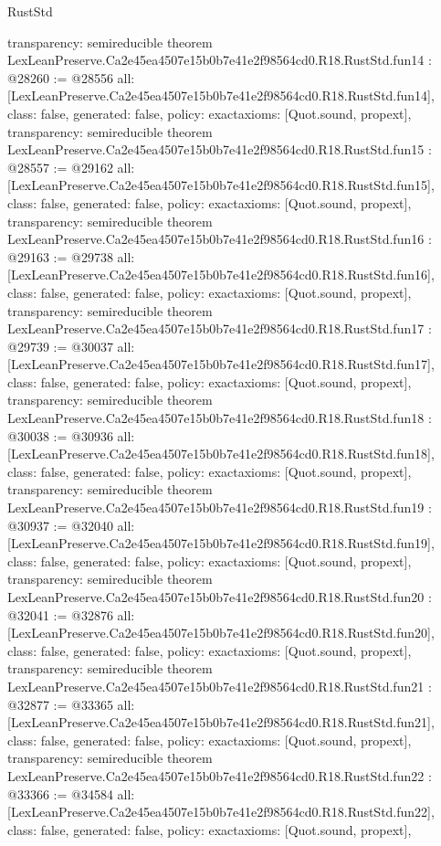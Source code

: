 \begin{lexlean}{RustStd}
\begin{coremodule}
{  transparency: semireducible
}
theorem LexLeanPreserve.Ca2e45ea4507e15b0b7e41e2f98564cd0.R18.RustStd.fun14 : @28260 := @28556 {
  all: [LexLeanPreserve.Ca2e45ea4507e15b0b7e41e2f98564cd0.R18.RustStd.fun14],
  class: false,
  generated: false,
  policy: exact{axioms: [Quot.sound, propext]},
  transparency: semireducible
}
theorem LexLeanPreserve.Ca2e45ea4507e15b0b7e41e2f98564cd0.R18.RustStd.fun15 : @28557 := @29162 {
  all: [LexLeanPreserve.Ca2e45ea4507e15b0b7e41e2f98564cd0.R18.RustStd.fun15],
  class: false,
  generated: false,
  policy: exact{axioms: [Quot.sound, propext]},
  transparency: semireducible
}
theorem LexLeanPreserve.Ca2e45ea4507e15b0b7e41e2f98564cd0.R18.RustStd.fun16 : @29163 := @29738 {
  all: [LexLeanPreserve.Ca2e45ea4507e15b0b7e41e2f98564cd0.R18.RustStd.fun16],
  class: false,
  generated: false,
  policy: exact{axioms: [Quot.sound, propext]},
  transparency: semireducible
}
theorem LexLeanPreserve.Ca2e45ea4507e15b0b7e41e2f98564cd0.R18.RustStd.fun17 : @29739 := @30037 {
  all: [LexLeanPreserve.Ca2e45ea4507e15b0b7e41e2f98564cd0.R18.RustStd.fun17],
  class: false,
  generated: false,
  policy: exact{axioms: [Quot.sound, propext]},
  transparency: semireducible
}
theorem LexLeanPreserve.Ca2e45ea4507e15b0b7e41e2f98564cd0.R18.RustStd.fun18 : @30038 := @30936 {
  all: [LexLeanPreserve.Ca2e45ea4507e15b0b7e41e2f98564cd0.R18.RustStd.fun18],
  class: false,
  generated: false,
  policy: exact{axioms: [Quot.sound, propext]},
  transparency: semireducible
}
theorem LexLeanPreserve.Ca2e45ea4507e15b0b7e41e2f98564cd0.R18.RustStd.fun19 : @30937 := @32040 {
  all: [LexLeanPreserve.Ca2e45ea4507e15b0b7e41e2f98564cd0.R18.RustStd.fun19],
  class: false,
  generated: false,
  policy: exact{axioms: [Quot.sound, propext]},
  transparency: semireducible
}
theorem LexLeanPreserve.Ca2e45ea4507e15b0b7e41e2f98564cd0.R18.RustStd.fun20 : @32041 := @32876 {
  all: [LexLeanPreserve.Ca2e45ea4507e15b0b7e41e2f98564cd0.R18.RustStd.fun20],
  class: false,
  generated: false,
  policy: exact{axioms: [Quot.sound, propext]},
  transparency: semireducible
}
theorem LexLeanPreserve.Ca2e45ea4507e15b0b7e41e2f98564cd0.R18.RustStd.fun21 : @32877 := @33365 {
  all: [LexLeanPreserve.Ca2e45ea4507e15b0b7e41e2f98564cd0.R18.RustStd.fun21],
  class: false,
  generated: false,
  policy: exact{axioms: [Quot.sound, propext]},
  transparency: semireducible
}
theorem LexLeanPreserve.Ca2e45ea4507e15b0b7e41e2f98564cd0.R18.RustStd.fun22 : @33366 := @34584 {
  all: [LexLeanPreserve.Ca2e45ea4507e15b0b7e41e2f98564cd0.R18.RustStd.fun22],
  class: false,
  generated: false,
  policy: exact{axioms: [Quot.sound, propext]},
}
\end{coremodule}
\end{lexlean}

